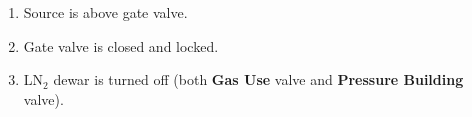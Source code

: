\begin{enumerate}
\begin{center}
           {\bf After Calibration}
\end{center}
\item\checkbox Source is above gate valve.
\item\checkbox Gate valve is closed and locked.
\item\checkbox LN$_2$ dewar is turned off (both {\bf Gas Use} valve and 
  {\bf Pressure Building} valve).
\end{enumerate}

 


